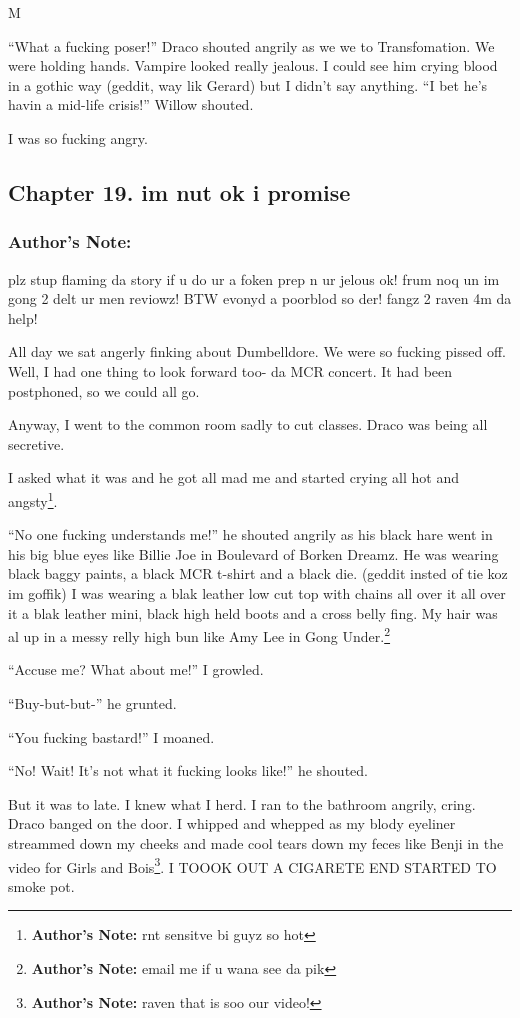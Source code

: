 M\documentclass{article}
\begin{document}
“What a fucking poser!” Draco shouted angrily as we we to Transfomation. We were holding hands. Vampire looked really jealous. I could see him crying blood in a gothic way (geddit, way lik Gerard) but I didn’t say anything. “I bet he’s havin a mid-life crisis!” Willow shouted.

I was so fucking angry.

\clearpage\nolinenumbers
\subsection*{Chapter 19. im nut ok i promise}

\subsubsection*{Author's Note: }plz stup flaming da story if u do ur a foken prep n ur jelous ok! frum noq un im gong 2 delt ur men reviowz! BTW evonyd a poorblod so der! fangz 2 raven 4m da help!

\textbreak
\linenumbers\resetlinenumber

All day we sat angerly finking about Dumbelldore. We were so fucking pissed off. Well, I had one thing to look forward too- da MCR concert. It had been postphoned, so we could all go.

Anyway, I went to the common room sadly to cut classes. Draco was being all secretive.

I asked what it was and he got all mad me and started crying all hot and angsty\footnote{\textbf{Author's Note: }rnt sensitve bi guyz so hot}.

“No one fucking understands me!” he shouted angrily as his black hare went in his big blue eyes like Billie Joe in Boulevard of Borken Dreamz. He was wearing black baggy paints, a black MCR t-shirt and a black die. (geddit insted of tie koz im goffik) I was wearing a blak leather low cut top with chains all over it all over it a blak leather mini, black high held boots and a cross belly fing. My hair was al up in a messy relly high bun like Amy Lee in Gong Under.\footnote{\textbf{Author's Note: }email me if u wana see da pik}

“Accuse me? What about me!” I growled.

“Buy-but-but-” he grunted.

“You fucking bastard!” I moaned.

“No! Wait! It’s not what it fucking looks like!” he shouted.

But it was to late. I knew what I herd. I ran to the bathroom angrily, cring. Draco banged on the door. I whipped and whepped as my blody eyeliner streammed down my cheeks and made cool tears down my feces like Benji in the video for Girls and Bois\footnote{\textbf{Author's Note: }raven that is soo our video!}. I TOOOK OUT A CIGARETE END STARTED TO smoke pot.
\end{document}
